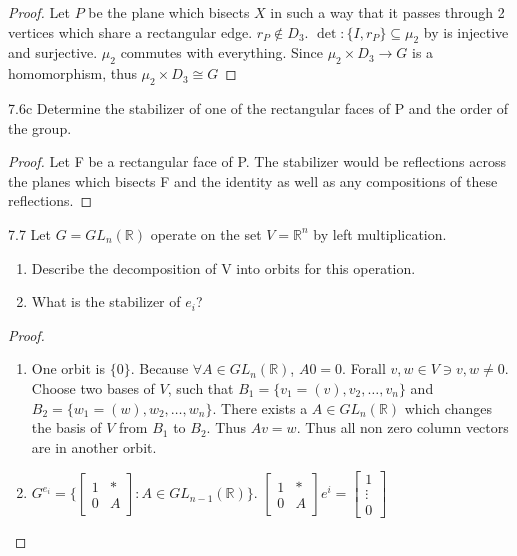 \documentclass{article}
\newcommand{\R}{\mathbb{R}}
\begin{document}
\begin{proof}
    Let $P$ be the plane which bisects $X$ in such a way that it passes through 2 vertices which share a rectangular edge. $r_P \not \in D_3$. $\det: \{I, r_P\} \subseteq \mu_2$ by is injective and surjective. $\mu_2$ commutes with everything. Since $\mu_2 \times D_3 \to G$ is a homomorphism, thus $\mu_2 \times D_3 \cong G$
\end{proof}
\begin{claim}{7.6c}
    Determine the stabilizer of one of the rectangular faces of P and the order of the group.
\end{claim}
\begin{proof}
    Let F be a rectangular face of P. The stabilizer would be reflections across the planes which bisects F and the identity as well as any compositions of these reflections.
\end{proof}

\bigskip

\begin{PROB}{7.7}\label{Problem 7.7.}
    Let $G = GL_n(\R)$ operate on the set $V = \R^n$ by left multiplication.
    \begin{enumerate}{}
        \item Describe the decomposition of V into orbits for this operation.
        \item What is the stabilizer of $e_i$?
    \end{enumerate}
\end{PROB}
\begin{proof}
    \begin{enumerate}{}
        \item One orbit is $\{0\}$. Because $\forall A \in GL_n(\R)$, $A0 = 0$. Forall $v, w \in V \ni v, w \neq 0$. Choose two bases of $V$, such that $B_1 = \{v_1 = (v), v_2, \ldots, v_n\}$ and $B_2 = \{w_1 = (w), w_2, \ldots, w_n\}$. There exists a $A \in GL_n(\R)$ which changes the basis of $V$ from $B_1$ to $B_2$. Thus $Av = w$. Thus all non zero column vectors are in another orbit.
        \item $G^{e_i} = \{\begin{bmatrix}
            1 & * \\
            0 & A
        \end{bmatrix} : A \in GL_{n - 1}(\R)\}$. $\begin{bmatrix}
            1 & * \\
            0 & A
        \end{bmatrix}e^i = \begin{bmatrix}
            1 \\ \vdots \\ 0
        \end{bmatrix}$
    \end{enumerate}
\end{proof}
\end{document}
